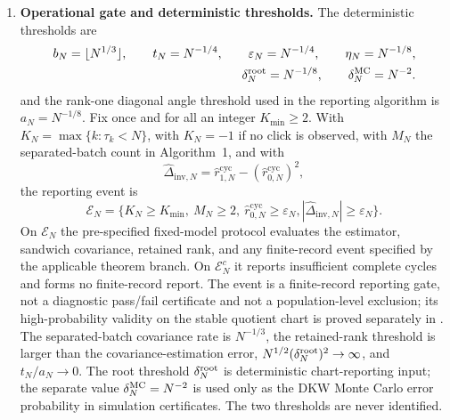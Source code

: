 \begin{assumption}
\begin{enumerate}[label=\textup{FR-\arabic*.},ref=FR-\arabic*,leftmargin=3.0em,itemsep=0.45em]
\item\label{fr:protocol-main}\textbf{Operational gate and deterministic thresholds.}
The deterministic thresholds are
\begin{equation}\label{prot:finite-record-main}
\begin{aligned}
b_N=\lfloor N^{1/3}\rfloor,\qquad
t_N=N^{-1/4},\qquad
\varepsilon_N=N^{-1/4},\qquad
\eta_N=N^{-1/8},\\
\delta_N^{\rm root}=N^{-1/8},
\qquad
\delta_N^{\rm MC}=N^{-2}.
\end{aligned}
\end{equation}
and the rank-one diagonal angle threshold used in the reporting algorithm is
\(a_N=N^{-1/8}\).  Fix once and for all an integer \(K_{\min}\ge2\).  With
\(K_N=\max\{k:\tau_k<N\}\), with \(K_N=-1\) if no click is observed, with
\(M_N\) the separated-batch count in Algorithm~1, and with
\[
\widehat\Delta_{\mathrm{inv},N}=
\widehat r_{1,N}^{\mathrm{cyc}}-(\widehat r_{0,N}^{\mathrm{cyc}})^2,
\]
the reporting event is
\begin{equation}\label{eq:finite-record-reporting-event-main}
\mathcal E_N=
\{K_N\ge K_{\min},\ M_N\ge2,\ \widehat r_{0,N}^{\mathrm{cyc}}\ge\varepsilon_N,
|\widehat\Delta_{\mathrm{inv},N}|\ge\varepsilon_N\}.
\end{equation}
On \(\mathcal E_N\) the pre-specified fixed-model protocol evaluates the
estimator, sandwich covariance, retained rank, and any finite-record event
specified by the applicable theorem branch.  On \(\mathcal E_N^c\) it reports
insufficient complete cycles and forms no finite-record report.  The event is
a finite-record reporting gate, not a diagnostic pass/fail certificate and not
a population-level exclusion; its high-probability validity on the stable
quotient chart is proved separately in
.  The separated-batch covariance
rate is \(N^{-1/3}\), the retained-rank threshold is larger than the
covariance-estimation error, \(N^{1/2}(\delta_N^{\rm root})^2\to\infty\), and
\(t_N/a_N\to0\).  The root threshold \(\delta_N^{\rm root}\) is deterministic
chart-reporting input; the separate value
\(\delta_N^{\rm MC}=N^{-2}\) is used only as the DKW Monte Carlo error
probability in simulation certificates.  The two thresholds are never
identified.


\end{enumerate}
\end{assumption}
